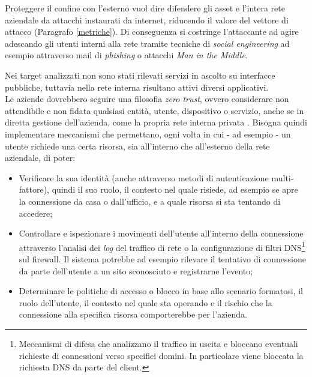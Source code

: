 \documentclass[target=bach,aauheader=]{thud}
\begin{document}
Proteggere il confine con l'esterno vuol dire difendere gli asset e l'intera rete aziendale da attacchi instaurati da internet, riducendo il valore del vettore di attacco (Paragrafo \ref{metriche}). Di conseguenza si costringe l'attaccante ad agire adescando gli utenti interni alla rete tramite tecniche di \textit{social engineering} ad esempio attraverso mail di \textit{phishing} o attacchi \textit{Man in the Middle}.

Nei target analizzati non sono stati rilevati servizi in ascolto su interfacce pubbliche, tuttavia nella rete interna risultano attivi diversi applicativi.
\\Le aziende dovrebbero seguire una filosofia \textit{zero trust}, ovvero considerare non attendibile e non fidata qualsiasi entità, utente, dispositivo o servizio, anche se in diretta gestione dell'azienda, come la propria rete interna privata \cite{zerotrust}. Bisogna quindi implementare meccanismi che permettano, ogni volta in cui - ad esempio - un utente richiede una certa risorsa, sia all'interno che all'esterno della rete aziendale, di poter:

\begin{itemize}
    \item Verificare la sua identità (anche attraverso metodi di autenticazione multi-fattore), quindi il suo ruolo, il contesto nel quale risiede, ad esempio se apre la connessione da casa o dall'ufficio, e a quale risorsa si sta tentando di accedere;
    \item Controllare e ispezionare i movimenti dell'utente all'interno della connessione attraverso l'analisi dei \textit{log} del traffico di rete o la configurazione di filtri DNS\footnote{Meccanismi di difesa che analizzano il traffico in uscita e bloccano eventuali richieste di connessioni verso specifici domini. In particolare viene bloccata la richiesta DNS da parte del client.} sul firewall. Il sistema potrebbe ad esempio rilevare il tentativo di connessione da parte dell'utente a un sito sconosciuto e registrarne l'evento;
    \item Determinare le politiche di accesso o blocco in base allo scenario formatosi, il ruolo dell'utente, il contesto nel quale sta operando e il rischio che la connessione alla specifica risorsa comporterebbe per l'azienda.
\end{itemize}
\end{document}
